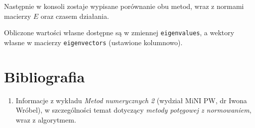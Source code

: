 \documentclass[12pt]{article}
\begin{document}
	Następnie w konsoli zostaje wypisane porównanie obu metod, wraz z normami macierzy $E$ oraz czasem działania.
	
	Obliczone wartości własne dostępne są w zmiennej \texttt{eigenvalues}, a wektory własne w macierzy \texttt{eigenvectors} (ustawione kolumnowo).
	
	
	
	\section{Bibliografia}
	\begin{enumerate}
		\item Informacje z wykładu \textit{Metod numerycznych 2} (wydział MiNI PW, dr Iwona Wróbel), w szczególności temat dotyczący \textit{metody potęgowej z normowaniem}, wraz z algorytmem.
	\end{enumerate}
	
\end{document}
